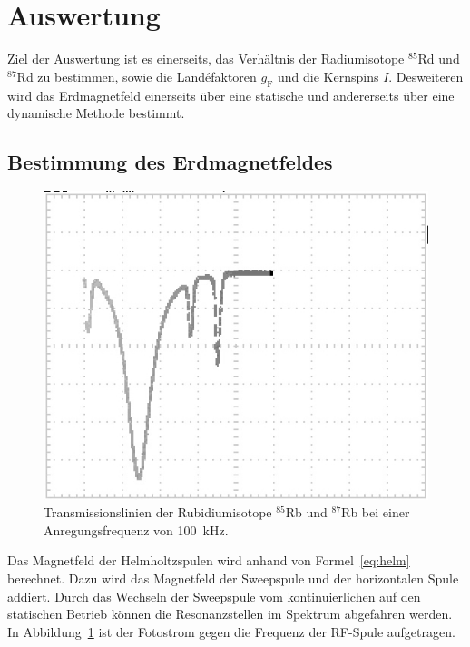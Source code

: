 \section{Auswertung}%
\label{sec:auswertung}

Ziel der Auswertung ist es einerseits, das Verhältnis der Radiumisotope
$^{85}$Rd und $^{87}$Rd zu bestimmen, sowie die Land\'efaktoren $g_\text{F}$ und
die Kernspins $I$.
Desweiteren wird das Erdmagnetfeld einerseits über eine statische
und andererseits über eine dynamische Methode bestimmt.
\subsection{Bestimmung des Erdmagnetfeldes}%
\label{sub:statische_bestimmung_des_erdmagnetfeldes}
\begin{figure}
	\centering
	\includegraphics[width=\linewidth]{picture/Transmission_Spek_cut.JPG}
	\caption{Transmissionslinien der Rubidiumisotope $^{85}$Rb und $^{87}$Rb bei
	einer Anregungsfrequenz von \SI{100}{\kilo\hertz}.}%
	\label{fig:transmission}
\end{figure}
Das Magnetfeld der Helmholtzspulen wird anhand von Formel~\ref{eq:helm}
berechnet.
Dazu wird das Magnetfeld der Sweepspule und der horizontalen Spule addiert.
Durch das Wechseln der Sweepspule vom kontinuierlichen auf den statischen Betrieb
können die Resonanzstellen im Spektrum abgefahren werden.
In Abbildung~\ref{fig:transmission} ist der Fotostrom gegen die Frequenz der
RF-Spule aufgetragen.

